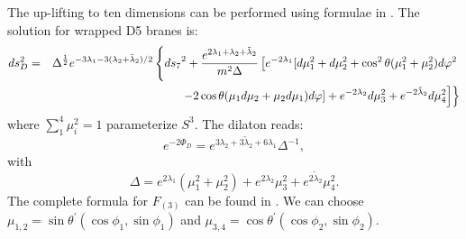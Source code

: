 \documentclass[a4paper,12pt]{article}
\begin{document}
The up-lifting to ten dimensions can be performed using 
formulae in \cite{cve1}. The solution for wrapped D5
branes is:
\begin{eqnarray}
ds^2_{D}&=& \Delta^{1\over2}e^{-3\lambda_{1}-3(\lambda_{2}+\tilde\lambda_{2})/2}\left \{{ds_{7}}^{2} + {e^{2\lambda_{1}+\lambda_{2}+\tilde\lambda_{2}}\over m^2\Delta}\left [
e^{-2\lambda_{1}}[d\mu_1^2+d\mu_2^2+\cos^{2}\theta(\mu_{1}^2+\mu_{2}^2)d\varphi^{2}\right.\right. \nonumber \\
&& \left.\left. -2\cos\theta(\mu_{1}d\mu_{2}+\mu_{2}d\mu_{1})d\varphi] +e^{-2\lambda_{2}}d\mu_3^2 + e^{-2\tilde\lambda_{2}}d\mu_4^2
\right]\right \}
\end{eqnarray}
where $\sum_1^4 \mu_i^2=1$ parameterize $S^3$. The dilaton reads:
\begin{equation}
e^{-2\Phi_{D}}= e^{3\lambda_{2}+3\tilde\lambda_{2}+6\lambda_{1}}\Delta^{-1},
\end{equation}
with
\begin{equation}
\Delta= e^{2\lambda_{1}}(\mu_1^2+\mu_2^2) +
e^{2\lambda_{2}}\mu_3^2+e^{2\tilde\lambda_{2}}\mu_4^2.
\end{equation}
The complete formula for $F_{(3)}$ can be found in \cite{cve1}. We can choose $\mu_{1,2}=\sin\theta^\prime(\cos\phi_1,
\sin\phi_1)$ and $\mu_{3,4}=\cos\theta^\prime(\cos\phi_2,
\sin\phi_2)$.
\end{document}
